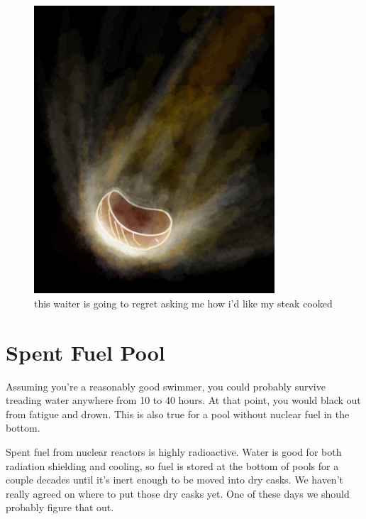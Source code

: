 \begin{figure}[!htbp]
\centering
\includegraphics[scale=0.5, max width=0.8\textwidth]{imgs/a/28/steak_burning.png}
\caption{this waiter is going to regret asking me how i'd like my steak cooked}
\end{figure}

{
\chapter{Spent Fuel Pool}
}

\hfill{}

{Assuming you’re a reasonably good swimmer, you could probably survive treading water anywhere from 10 to 40 hours. At that point, you would black out from fatigue and drown. This is also true for a pool without nuclear fuel in the bottom.}

{Spent fuel from nuclear reactors is highly radioactive. Water is good for both radiation shielding and cooling, so fuel is stored at the bottom of pools for a couple decades until it’s inert enough to be moved into dry casks. We haven’t really agreed on where to put those dry casks yet. One of these days we should probably figure that out.}

